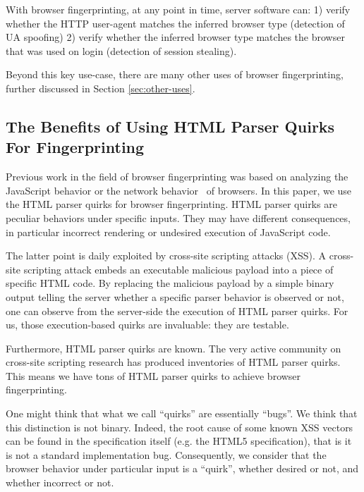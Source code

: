 \documentclass[10pt]{IEEEtran}
\begin{document}
With browser fingerprinting, at any point in time, server software can:
1) verify whether the HTTP user-agent matches the inferred browser type (detection of UA spoofing)
2) verify whether the inferred browser type matches the browser that was used on login (detection of session stealing).


Beyond this key use-case, there are many other uses of browser fingerprinting, further discussed
in Section \ref{sec:other-uses}.


\subsection{The Benefits of Using HTML Parser Quirks For Fingerprinting}
Previous work in the field of browser fingerprinting was based on analyzing the 
JavaScript  behavior \cite{mowery2011fingerprinting} or the network behavior~\cite{yen2009browser} of browsers.
In this paper, we use the HTML parser quirks for browser fingerprinting.
HTML parser quirks are peculiar behaviors under specific inputs.
They may have different consequences, in particular incorrect rendering or 
undesired execution of JavaScript code. 




The latter point is daily exploited by 
cross-site scripting attacks (XSS).
A cross-site scripting attack embeds an executable malicious payload into a piece 
of specific HTML code.
By replacing the malicious payload by a simple binary output telling the server 
whether a specific parser behavior is observed or not, one can observe from the 
server-side the execution of HTML parser quirks. 
For us, those execution-based quirks are invaluable: they are testable.




Furthermore, HTML parser quirks are known. The very active community on cross-site 
scripting research has produced inventories of HTML parser quirks.
This means we have tons of HTML parser quirks to achieve browser fingerprinting.




One might think that what we call ``quirks'' are essentially ``bugs''. We think that this distinction
is not binary. Indeed, the root cause of some known XSS vectors can be found in the specification
itself (e.g. the HTML5 specification), that is it is not a standard  implementation bug.
Consequently, we consider that the browser behavior under particular input  is a ``quirk'', whether desired or not, and whether incorrect or not.
\end{document}
